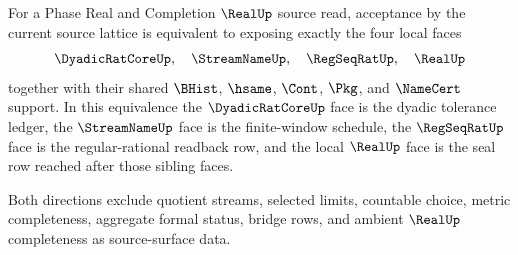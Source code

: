 \begin{theorem}
\label{thm:real-l10-source-lattice-four-face-equivalence}
For a Phase Real and Completion $\RealUp$ source read, acceptance by the
current source lattice is equivalent to exposing exactly the four local faces
$$
\DyadicRatCoreUp,\quad \StreamNameUp,\quad \RegSeqRatUp,\quad \RealUp
$$
together with their shared $\BHist$, $\hsame$, $\Cont$, $\Pkg$, and
$\NameCert$ support. In this equivalence the $\DyadicRatCoreUp$ face is the
dyadic tolerance ledger, the $\StreamNameUp$ face is the finite-window
schedule, the $\RegSeqRatUp$ face is the regular-rational readback row, and
the local $\RealUp$ face is the seal row reached after those sibling faces.

Both directions exclude quotient streams, selected limits, countable choice,
metric completeness, aggregate formal status, bridge rows, and ambient
$\RealUp$ completeness as source-surface data.
\end{theorem}
